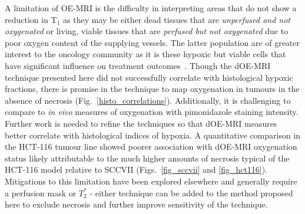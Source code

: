 A limitation of OE-MRI is the difficulty in interpreting areas that do not show a reduction in T$_1$ as they may be either dead tissues that are \textit{unperfused and not oxygenated} or living, viable tissues that are \textit{perfused but not oxygenated} due to poor oxygen content of the supplying vessels. 
The latter population are of greater interest to the oncology community as it is these hypoxic but viable cells that have significant influence on treatment outcomes~\cite{Horsman:2016go}. 
Though the \acs{dOE-MRI} technique presented here did not successfully correlate with histological hypoxic fractions, there is promise in the technique to map oxygenation in tumours in the absence of necrosis (Fig.~\ref{histo_correlations}). 
Additionally, it is challenging to compare to \emph{in vivo} measures of oxygenation with pimonidazole staining intensity. 
Further work is needed to refine the techniques so that \acs{dOE-MRI} measures better correlate with histological indices of hypoxia. 
A quantitative comparison in the HCT-116 tumour line showed poorer association with \acs{dOE-MRI} oxygenation status likely attributable to the much higher amounts of necrosis typical of the HCT-116 model relative to SCCVII (Figs.~\ref{fig_sccvii} and \ref{fig_hct116}).
Mitigations to this limitation have been explored elsewhere and generally require a perfusion mask or $T_2^*$ - either technique can be added to the method proposed here to exclude necrosis and further improve sensitivity of the technique.


